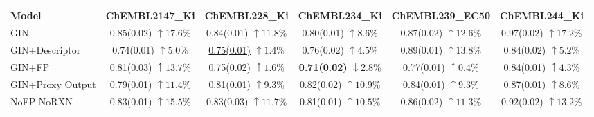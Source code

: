 \begin{table}[t]
\centering
{\small
\setlength{\tabcolsep}{4pt}
\begin{tabular}{l*{5}{c}}
\hline
Model
& ChEMBL2147\_Ki
& ChEMBL228\_Ki
& ChEMBL234\_Ki
& ChEMBL239\_EC50
& ChEMBL244\_Ki
\\
\hline
GIN
& \shortstack{0.85(0.02)\\$\uparrow 17.6\%$}
& \shortstack{0.84(0.01)\\$\uparrow 11.8\%$}
& \shortstack{0.80(0.01)\\$\uparrow 8.6\%$}
& \shortstack{0.87(0.02)\\$\uparrow 12.6\%$}
& \shortstack{0.97(0.02)\\$\uparrow 17.2\%$} \\

GIN+Descriptor
& \shortstack{0.74(0.01)\\$\uparrow 5.0\%$}
& \shortstack{\underline{0.75(0.01)}\\$\uparrow 1.4\%$}
& \shortstack{0.76(0.02)\\$\uparrow 4.5\%$}
& \shortstack{0.89(0.01)\\$\uparrow 13.8\%$}
& \shortstack{0.84(0.02)\\$\uparrow 5.2\%$} \\

GIN+FP
& \shortstack{0.81(0.03)\\$\uparrow 13.7\%$}
& \shortstack{0.75(0.02)\\$\uparrow 1.6\%$}
& \shortstack{\textbf{0.71(0.02)}\\$\downarrow 2.8\%$}
& \shortstack{0.77(0.01)\\$\uparrow 0.4\%$}
& \shortstack{0.84(0.01)\\$\uparrow 4.3\%$} \\

GIN+Proxy Output
& \shortstack{0.79(0.01)\\$\uparrow 11.4\%$}
& \shortstack{0.81(0.01)\\$\uparrow 9.3\%$}
& \shortstack{0.82(0.02)\\$\uparrow 10.9\%$}
& \shortstack{0.84(0.01)\\$\uparrow 9.3\%$}
& \shortstack{0.87(0.01)\\$\uparrow 8.6\%$} \\

NoFP-NoRXN
& \shortstack{0.83(0.01)\\$\uparrow 15.5\%$}
& \shortstack{0.83(0.03)\\$\uparrow 11.7\%$}
& \shortstack{0.81(0.01)\\$\uparrow 10.5\%$}
& \shortstack{0.86(0.02)\\$\uparrow 11.3\%$}
& \shortstack{0.92(0.02)\\$\uparrow 13.2\%$} \\


\end{tabular}}
\end{table}
